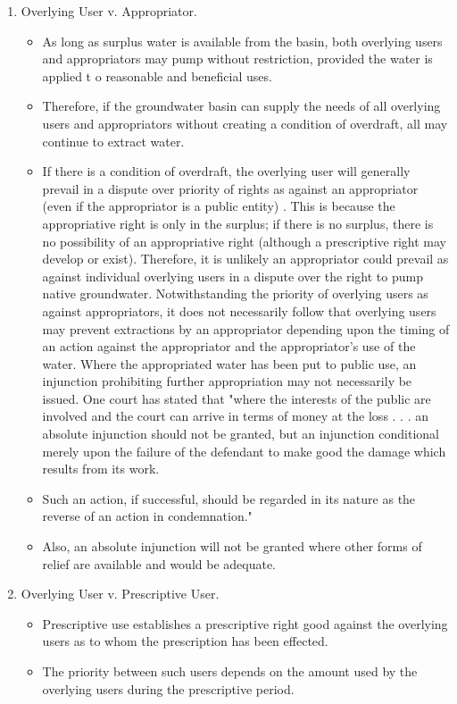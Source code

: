 \documentclass{article}
\begin{document}
\begin{enumerate}
\begin{itemize}
\begin{enumerate}
\item Overlying User v. Appropriator.
\begin{itemize} 
\item As long as surplus water is available from the basin, both overlying users and appropriators may pump without restriction, provided the water is applied t o reasonable and beneficial uses.
\item Therefore, if the groundwater basin can supply the needs of all overlying users and appropriators without creating a condition of overdraft, all may continue to extract water. 
\item If there is a condition of overdraft, the overlying user will generally prevail in a dispute over priority of rights as against an appropriator (even if the appropriator is a public entity) . This is because the appropriative right is only in the surplus; if there is no surplus, there is no possibility of an appropriative right (although a prescriptive right may develop or exist). Therefore, it is unlikely an appropriator could prevail as against individual overlying users in a dispute over the right to pump native groundwater. Notwithstanding the priority of overlying users as against appropriators, it does not necessarily follow that overlying users may prevent extractions by an appropriator depending upon the timing of an action against the appropriator and the appropriator's use of the water. Where the appropriated water has been put to public use, an injunction prohibiting further appropriation may not necessarily be issued. One court has stated that "where the interests of the public are involved and the court can arrive in terms of money at the loss . . . an absolute injunction should not be granted, but an injunction conditional merely upon the failure of the defendant to make good the damage which results from its work. 
\item Such an action, if successful, should be regarded in its nature as the reverse of an action in condemnation." 
\item Also, an absolute injunction will not be granted where other forms of relief are available and would be adequate.
\end{itemize}
\item Overlying User v. Prescriptive User. 
\begin{itemize}
\item Prescriptive use establishes a prescriptive right good against the overlying users as to whom the prescription has been effected. 
\item The priority between such users depends on the amount used by the overlying users during the prescriptive period. 

\end{itemize}
\end{enumerate}
\end{itemize}
\end{enumerate}
\end{document}
